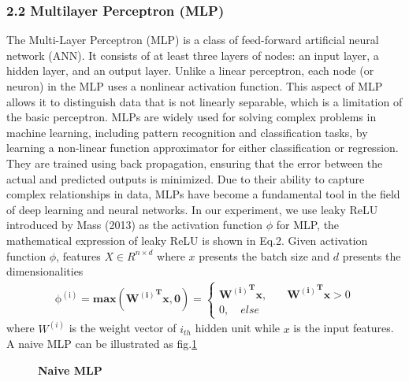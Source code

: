 \documentclass[10pt,letterpaper]{article}
\begin{document}
\subsubsection*{2.2 Multilayer Perceptron (MLP)}
The Multi-Layer Perceptron (MLP) is a class of feed-forward artificial neural network (ANN). It consists of at least three layers of nodes: an input layer, a hidden layer, and an output layer. Unlike a linear perceptron, each node (or neuron) in the MLP uses a nonlinear activation function. This aspect of MLP allows it to distinguish data that is not linearly separable, which is a limitation of the basic perceptron. MLPs are widely used for solving complex problems in machine learning, including pattern recognition and classification tasks, by learning a non-linear function approximator for either classification or regression. They are trained using back propagation, ensuring that the error between the actual and predicted outputs is minimized. Due to their ability to capture complex relationships in data, MLPs have become a fundamental tool in the field of deep learning and neural networks.
In our experiment, we use leaky ReLU introduced by Mass (2013) as the activation function \(\phi\) for MLP, the mathematical expression of leaky ReLU  is shown in Eq.2. Given activation function \(\phi\), features \(X \in R^ {n\times d}\) where \(x\) presents the batch size and \(d\) presents the dimensionalities
\begin{eqnarray}
\label{eq:schemeP}
\mathrm{\phi^{(i)}} =\mathbf{max({W^{(i)}}^{T}x,0)}=
\begin{cases}
\mathbf{{W^{(i)}}^{T}x},\quad &\mathbf{{W^{(i)}}^{T}x}>0\\0, \quad else
\end{cases}
\end{eqnarray}
where \(W^{(i)}\) is the weight vector of \(i_{th}\) hidden unit while \(x\) is the input features. A naive MLP can be illustrated as fig.\ref{MLP}
\begin{figure}[!h]
\caption{{\bf Naive MLP}}
\label{MLP}
\end{figure}
\end{document}
